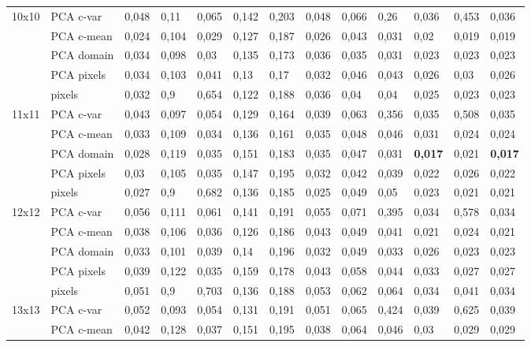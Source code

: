 \documentclass{article}
\begin{document}
\begin{table}[H]
\begin{tabular}{l|l|llllllllll|l|}
    10x10 & PCA c-var & 0,048 & 0,11  & 0,065 & 0,142 & 0,203 & 0,048 & 0,066 & 0,26  & 0,036 & 0,453 & 0,036 \\
          & PCA c-mean & 0,024 & 0,104 & 0,029 & 0,127 & 0,187 & 0,026 & 0,043 & 0,031 & 0,02  & 0,019 & 0,019 \\
          & PCA domain & 0,034 & 0,098 & 0,03  & 0,135 & 0,173 & 0,036 & 0,035 & 0,031 & 0,023 & 0,023 & 0,023 \\
          & PCA pixels & 0,034 & 0,103 & 0,041 & 0,13  & 0,17  & 0,032 & 0,046 & 0,043 & 0,026 & 0,03  & 0,026 \\
          & pixels & 0,032 & 0,9   & 0,654 & 0,122 & 0,188 & 0,036 & 0,04  & 0,04  & 0,025 & 0,023 & 0,023 \\ \hline
    11x11 & PCA c-var & 0,043 & 0,097 & 0,054 & 0,129 & 0,164 & 0,039 & 0,063 & 0,356 & 0,035 & 0,508 & 0,035 \\
          & PCA c-mean & 0,033 & 0,109 & 0,034 & 0,136 & 0,161 & 0,035 & 0,048 & 0,046 & 0,031 & 0,024 & 0,024 \\
          & PCA domain & 0,028 & 0,119 & 0,035 & 0,151 & 0,183 & 0,035 & 0,047 & 0,031 & \textbf{0,017} & 0,021 & \textbf{0,017} \\
          & PCA pixels & 0,03  & 0,105 & 0,035 & 0,147 & 0,195 & 0,032 & 0,042 & 0,039 & 0,022 & 0,026 & 0,022 \\
          & pixels & 0,027 & 0,9   & 0,682 & 0,136 & 0,185 & 0,025 & 0,049 & 0,05  & 0,023 & 0,021 & 0,021 \\ \hline
    12x12 & PCA c-var & 0,056 & 0,111 & 0,061 & 0,141 & 0,191 & 0,055 & 0,071 & 0,395 & 0,034 & 0,578 & 0,034 \\
          & PCA c-mean & 0,038 & 0,106 & 0,036 & 0,126 & 0,186 & 0,043 & 0,049 & 0,041 & 0,021 & 0,024 & 0,021 \\
          & PCA domain & 0,033 & 0,101 & 0,039 & 0,14  & 0,196 & 0,032 & 0,049 & 0,033 & 0,026 & 0,023 & 0,023 \\
          & PCA pixels & 0,039 & 0,122 & 0,035 & 0,159 & 0,178 & 0,043 & 0,058 & 0,044 & 0,033 & 0,027 & 0,027 \\
          & pixels & 0,051 & 0,9   & 0,703 & 0,136 & 0,188 & 0,053 & 0,062 & 0,064 & 0,034 & 0,041 & 0,034 \\ \hline
    13x13 & PCA c-var & 0,052 & 0,093 & 0,054 & 0,131 & 0,191 & 0,051 & 0,065 & 0,424 & 0,039 & 0,625 & 0,039 \\
          & PCA c-mean & 0,042 & 0,128 & 0,037 & 0,151 & 0,195 & 0,038 & 0,064 & 0,046 & 0,03  & 0,029 & 0,029 \\

\end{tabular}
\end{table}
\end{document}
